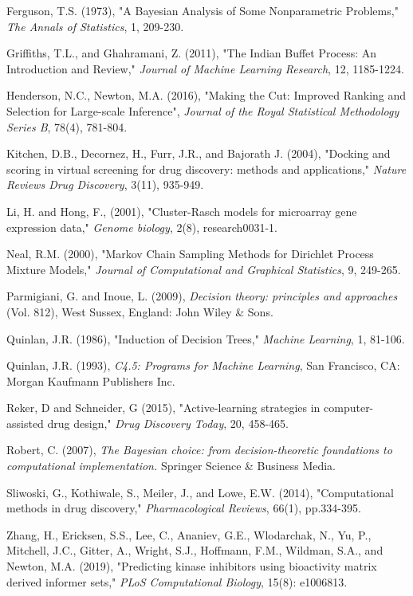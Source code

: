 \documentclass[12pt]{article}
\begin{document}
\begin{list}{}{}
\item Ferguson, T.S. (1973), "A Bayesian Analysis of Some Nonparametric Problems," {\em The Annals of Statistics}, 1, 209-230.

\item Griffiths, T.L., and Ghahramani, Z. (2011), "The Indian Buffet Process: An Introduction and Review," {\em Journal of Machine Learning Research}, 12, 1185-1224.

\item Henderson, N.C., Newton, M.A. (2016), "Making the Cut: Improved Ranking and Selection for Large-scale Inference", {\em Journal of the Royal Statistical Methodology Series B}, 78(4), 781-804.

\item Kitchen, D.B., Decornez, H., Furr, J.R., and  Bajorath J. (2004), "Docking and scoring in virtual screening for drug discovery: methods and applications," {\em Nature Reviews Drug Discovery}, 3(11), 935-949.

\item Li, H. and Hong, F., (2001), "Cluster-Rasch models for microarray gene expression data," {\em Genome biology}, 2(8), research0031-1.

\item Neal, R.M. (2000), "Markov Chain Sampling Methods for Dirichlet Process Mixture Models," {\em Journal of Computational and Graphical Statistics}, 9, 249-265.

\item Parmigiani, G. and Inoue, L. (2009), {\em Decision theory: principles and approaches} (Vol. 812), West Sussex, England: John Wiley \& Sons.

\item Quinlan, J.R. (1986), "Induction of Decision Trees," {\em Machine Learning}, 1, 81-106.

\item Quinlan, J.R. (1993), {\em C4.5: Programs for Machine Learning}, San Francisco, CA: Morgan Kaufmann Publishers Inc.

\item Reker, D and Schneider, G (2015), "Active-learning 
strategies in computer-assisted drug design," {\em Drug Discovery Today}, 20, 458-465.

\item Robert, C. (2007), {\em The Bayesian choice: from decision-theoretic foundations to computational implementation.} Springer Science \& Business Media.

\item Sliwoski, G., Kothiwale, S., Meiler, J., and Lowe, E.W. (2014), "Computational methods in drug discovery," {\em Pharmacological Reviews}, 66(1), pp.334-395.

\item  Zhang, H.,   Ericksen, S.S.,  Lee, C.,  Ananiev, G.E., Wlodarchak, N., Yu, P., Mitchell, J.C.,  Gitter, A.,  Wright, S.J., Hoffmann, F.M.,  Wildman, S.A., and 
Newton, M.A. (2019), "Predicting kinase inhibitors using bioactivity matrix derived informer sets," {\em PLoS Computational Biology}, 15(8): e1006813. 


\end{list}
\end{document}
